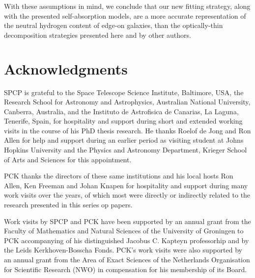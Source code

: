 \documentclass[useAMS,usenatbib]{mn2e}
\begin{document}
With these assumptions in mind, we conclude that our new fitting 
strategy, along with the presented self-absorption models, are a 
more accurate representation of the neutral hydrogen content of 
edge-on galaxies, than the optically-thin decomposition strategies 
presented here and by other authors.


\section*{Acknowledgments}
SPCP is grateful to the Space Telescope Science Institute, Baltimore, USA, the 
Research School for Astronomy and Astrophysics, Australian National University, 
Canberra, Australia, and the Instituto de Astrofisica de Canarias, La Laguna, 
Tenerife, Spain, for hospitality and support during  short and extended
working visits in the course of his PhD thesis research. He thanks
Roelof de Jong and Ron Allen for help and support during an earlier 
period as visiting student at Johns Hopkins University and 
the Physics and Astronomy Department, Krieger School of Arts and Sciences 
for this appointment.

PCK thanks the directors of these same institutions and his local hosts
Ron Allen, Ken Freeman and Johan Knapen for hospitality and support
during many work visits over the years, of which most were 
directly or indirectly related to the research presented in this series op 
papers.

Work visits by SPCP and PCK have been supported by an annual grant 
from the Faculty of Mathematics and Natural Sciences of 
the University of Groningen to PCK accompanying of his distinguished Jacobus 
C. Kapteyn professorhip and by the Leids Kerkhoven-Bosscha Fonds. PCK's work
visits were also supported by an annual grant from the Area  of Exact 
Sciences of the Netherlands Organisation for Scientific Research (NWO) in 
compensation for his membership of its Board.














\bsp

\label{lastpage}
\end{document}
